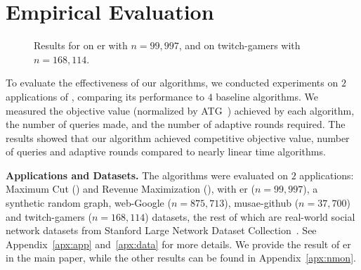 \section{Empirical Evaluation}\label{sec:exp}
\begin{figure*}[ht]
    \centering
    \caption{Results for \maxcut on er with $n=99,997$,
    and \revmax on twitch-gamers with $n=168,114$.}
    \label{fig:er}
\end{figure*}
To evaluate the effectiveness of our algorithms,
we conducted experiments on $2$ applications of \nmon,
comparing its performance to $4$ baseline algorithms.
We measured the objective value (normalized by ATG~\citep{Chen2024}) achieved by each algorithm,
the number of queries made, and the number of adaptive rounds required.
The results showed that our algorithm achieved competitive objective value,
number of queries and adaptive rounds 
compared to nearly linear time algorithms.

\textbf{Applications and Datasets.}
The algorithms were evaluated on $2$ applications: 
Maximum Cut (\maxcut) and Revenue Maximization (\revmax),
with er ($n=99,997$), a synthetic random graph,
web-Google ($n=875,713$),
musae-github ($n=37,700$) and twitch-gamers ($n=168,114$) datasets, the rest of which are
real-world social network datasets from Stanford Large Network Dataset Collection~\citep{snapnets}.
See Appendix~\ref{apx:app} and~\ref{apx:data} for more details.
We provide the result of er in the main paper,
while the other results can be found in Appendix~\ref{apx:nmon}.

